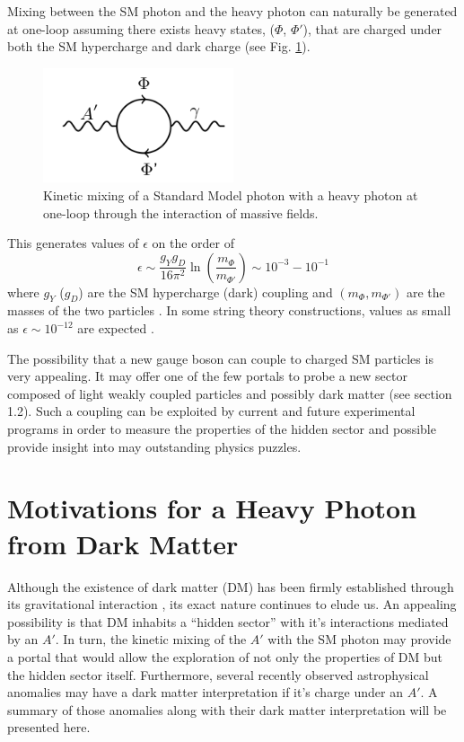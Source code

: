 Mixing between the SM photon and the heavy photon can naturally be 
generated at one-loop assuming there exists heavy states, ($\Phi$, $\Phi'$), 
that are charged under both the SM hypercharge and dark charge (see Fig. \ref{fig:ap_loop}).
\begin{figure}
    \centering
    \includegraphics[width=0.5\textwidth]{images/aprime_loop.png}
    \caption{Kinetic mixing of a Standard Model photon with a heavy photon 
    at one-loop through the interaction of massive fields.}
    \label{fig:ap_loop}
\end{figure}
This generates values of $\epsilon$ on the order of 
\begin{equation}
    \epsilon \sim \frac{g_Yg_D}{16\pi^2}\ln\left(\frac{m_{\Phi}}{m_{\Phi'}} \right)
             \sim 10^{-3} - 10^{-1} 
\end{equation}
where $g_Y$ ($g_D$) are the SM hypercharge (dark) coupling and 
$(m_{\Phi}, m_{\Phi'})$ are the masses of the two particles
\cite{arkani-hamed2008, bjorken2009}.  In some string theory constructions, 
values as small as $\epsilon \sim 10^{-12}$ are expected 
\cite{goodsell2010,Goodsell:2009xc, Cicoli:2011yh}.

%
%

The possibility that a new gauge boson can couple to charged SM particles is 
very appealing.  It may offer one of the few portals to probe a new sector 
composed of light weakly coupled particles and possibly dark matter
(see section 1.2).  Such a coupling can be exploited by current and future
experimental programs in order to measure the properties of
the hidden sector and possible provide insight into may outstanding physics puzzles.

\section{Motivations for a Heavy Photon from Dark Matter}

Although the existence of dark matter (DM) has been firmly established through its
gravitational interaction \cite{popolo2014}, its exact nature continues to elude
us. An appealing
possibility is that DM inhabits a ``hidden sector'' with it's interactions 
mediated by an $A'$.  In turn, the kinetic mixing of the $A'$ with the SM 
photon may provide a portal that would allow the exploration of not only the 
properties of DM but the hidden sector itself.  Furthermore, several recently
observed astrophysical anomalies \cite{pamela2008, ackermann2012, aguilar2013, 
hooper2011, linden2011, abazajian2012, hooper2013, Bulbul:2014sua}
may have a dark matter interpretation if it's
charge under an $A'$.  A summary of those anomalies along with their dark matter
interpretation will be presented here.

